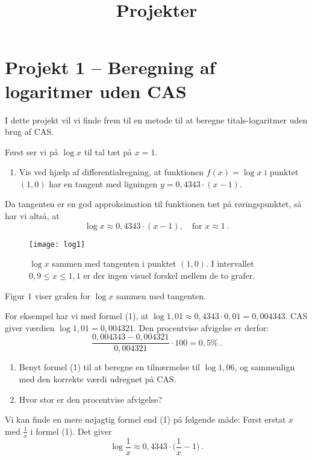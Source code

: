\documentclass[12pt,oneside,a4paper]{article}
\title{Projekter}
\date{\vspace{-5ex}}
\theoremstyle{plain}
\begin{document}
\maketitle

\section*{Projekt 1 -- Beregning af logaritmer uden CAS}
I dette projekt vil vi finde frem til en metode til at beregne
titals-logaritmer uden brug af CAS.

Først ser vi på $\log x$ til tal tæt på $x=1$.

\begin{enumerate}[label=(\alph*)]
    \item Vis ved hjælp af differentialregning, at funktionen $f(x) = \log x$ i
        punktet $(1, 0)$ har en tangent med ligningen $y = 0,4343 \cdot (x-1)$.
\end{enumerate}
Da tangenten er en god approksimation til funktionen tæt på røringspunktet,
så har vi altså, at 
\[
    \tag{1}
    \log x \approx 0,4343\cdot(x-1),\quad \mbox{for $x\approx 1$}\,.
\]
\begin{figure}[ht]
    \centering
    \texttt{[image: log1]}
    \caption{$\log x$ sammen med tangenten i punktet $(1, 0)$. I intervallet $0,9\le x\le 1,1$ er der ingen visuel forskel mellem de to grafer.}
    \label{log1}
\end{figure}
Figur 1 viser grafen for $\log x$ sammen med tangenten.

For eksempel har vi med formel (1), at $\log 1,01 \approx 0,4343\cdot 0,01 = 0,004343$.
CAS giver værdien $\log 1,01 = 0,004321$. Den procentvise afvigelse er derfor:
\[
    \frac{0,004343-0,004321}{0,004321}\cdot 100 = 0,5 \% \,.
\]

\begin{enumerate}[label=(\alph*), resume]
    \item Benyt formel (1) til at beregne en tilnærmelse til $\log
        1,06$, og sammenlign med den korrekte værdi udregnet på CAS.
    \item Hvor stor er den procentvise afvigelse?
\end{enumerate}

Vi kan finde en mere nøjagtig formel end (1) på følgende måde: Først erstat $x$ med
$\frac1x$ i formel (1). Det giver
\[
    \tag{2}
    \log\frac1x \approx 0,4343\cdot\Big(\frac1x-1\Big)\,.
\]
\end{document}
